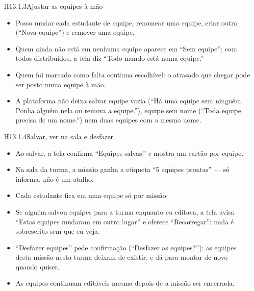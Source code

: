 \begin{historia}{H13.1.3}{Ajustar as equipes à mão}{\pronto}
\aceite
\begin{itemize}
  \item Posso mudar cada estudante de equipe, renomear uma equipe, criar outra
    (\enquote{Nova equipe}) e remover uma equipe.
  \item Quem ainda não está em nenhuma equipe aparece em \enquote{Sem equipe};
    com todos distribuídos, a tela diz \enquote{Todo mundo está numa equipe.}
  \item Quem foi marcado como falta continua escolhível: o atrasado que chegar
    pode ser posto numa equipe à mão.
  \item A plataforma não deixa salvar equipe vazia (\enquote{Há uma equipe sem
    ninguém. Ponha alguém nela ou remova a equipe.}), equipe sem nome
    (\enquote{Toda equipe precisa de um nome.}) nem duas equipes com o mesmo
    nome.
\end{itemize}
\end{historia}

\begin{historia}{H13.1.4}{Salvar, ver na sala e desfazer}{\pronto}
\aceite
\begin{itemize}
  \item Ao salvar, a tela confirma \enquote{Equipes salvas.} e mostra um
    cartão por equipe.
  \item Na sala da turma, a missão ganha a etiqueta \enquote{5 equipes
    prontas} --- só informa, não é um atalho.
  \item Cada estudante fica em uma equipe só por missão.
  \item Se alguém salvou equipes para a turma enquanto eu editava, a tela
    avisa \enquote{Estas equipes mudaram em outro lugar} e oferece
    \enquote{Recarregar}: nada é sobrescrito sem que eu veja.
  \item \enquote{Desfazer equipes} pede confirmação (\enquote{Desfazer as
    equipes?}): as equipes desta missão nesta turma deixam de existir, e dá
    para montar de novo quando quiser.
  \item As equipes continuam editáveis mesmo depois de a missão ser
    encerrada.
\end{itemize}
\end{historia}


